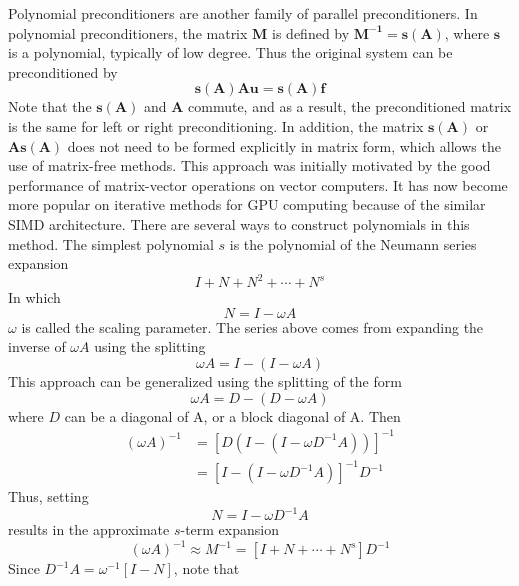 Polynomial preconditioners are another family of parallel preconditioners. In polynomial preconditioners, the matrix $\boldsymbol{M}$ is defined by $\boldsymbol{M^{-1} = s(A)}$, where $\boldsymbol{s}$ is a polynomial, typically of low degree. Thus the original system can be preconditioned by 
\begin{equation}
    \boldsymbol{s(A)Au = s(A)f}
\end{equation}
Note that the $\boldsymbol{s(A)}$ and $\boldsymbol{A}$ commute, and as a result, the preconditioned matrix is the same for left or right preconditioning. In addition, the matrix $\boldsymbol{s(A)}$ or $\boldsymbol{As(A)}$ does not need to be formed explicitly in matrix form, which allows the use of matrix-free methods.
This approach was initially motivated by the good performance of matrix-vector operations on vector computers. It has now become more popular on iterative methods for GPU computing because of the similar SIMD architecture. 
There are several ways to construct polynomials in this method.
The simplest polynomial $s$ is the polynomial of the Neumann series expansion
\begin{equation}
    I + N + N^2 + \cdots + N^s
\end{equation}
In which
\begin{equation}
    N = I - \omega A
\end{equation}
$\omega$ is called the scaling parameter. The series above comes from expanding the inverse of $\omega A$ using the splitting
\begin{equation}
    \omega A = I - (I - \omega A)
\end{equation}
This approach can be generalized using the splitting of the form
\begin{equation}
    \omega A = D - (D - \omega A)
\end{equation}
where $D$ can be a diagonal of A, or a block diagonal of A.
Then
\begin{align}
    (\omega A)^{-1} &= [D(I - (I - \omega D^{-1}A))]^{-1} \nonumber \\
    &= [I - (I - \omega D^{-1}A)]^{-1}D^{-1}
\end{align}
Thus, setting
\begin{equation}
    N = I - \omega D^{-1}A
\end{equation}
results in the approximate $s$-term expansion
\begin{equation}
    (\omega A)^{-1} \approx M^{-1} = [I + N + \cdots + N^s]D^{-1}
\end{equation}
Since $D^{-1}A = \omega^{-1}[I - N]$, note that

